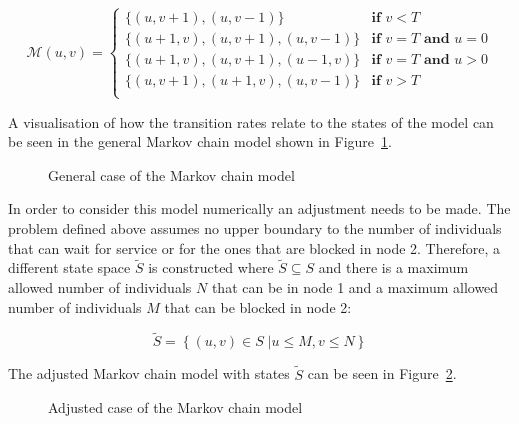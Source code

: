 \begin{equation}\label{eq:state_map_to_destination_states}
    \mathcal{M}(u, v) =
    \begin{cases}
        \{(u, v + 1), (u, v - 1)\} & \textbf{if } v < T \\
        \{(u + 1, v), (u, v + 1), (u, v - 1)\} & \textbf{if } v = T
        \textbf{ and } u = 0 \\
        \{(u + 1, v), (u, v + 1), (u - 1, v)\} & \textbf{if } v = T
        \textbf{ and } u > 0 \\
        \{(u, v + 1), (u + 1, v), (u, v - 1)\} & \textbf{if } v > T \\
    \end{cases}
\end{equation}


A visualisation of how the transition rates relate to the states of the model
can be seen in the general Markov chain model shown in
Figure~\ref{fig:general_markov_model}.

\begin{figure}[H]
    \centering
    \scalebox{.8}
    {}
    \caption{General case of the Markov chain model} 
    \label{fig:general_markov_model}
\end{figure}


In order to consider this model numerically an adjustment needs to be made.
The problem defined above assumes no upper boundary to the number of individuals
that can wait for service or for the ones that are blocked in node 2.
Therefore, a different state space \( \tilde S \) is constructed where
\( \tilde S \subseteq S \) and there is a maximum allowed number of individuals
\(N\) that can be in node 1 and a maximum allowed number of individuals
\(M\) that can be blocked in node 2:

\begin{equation}\label{eq:truncated_state_space}
    \tilde S = \left\{ (u, v) \in S\;| u \leq M, v\leq N \right\}
\end{equation}

The adjusted Markov chain model with states \(\tilde S\) can be seen in
Figure~\ref{fig:adjusted_markov_model}.

\begin{figure}[H]
    \centering
    \scalebox{.8}
    {}
    \caption{Adjusted case of the Markov chain model} 
    \label{fig:adjusted_markov_model}
\end{figure}


